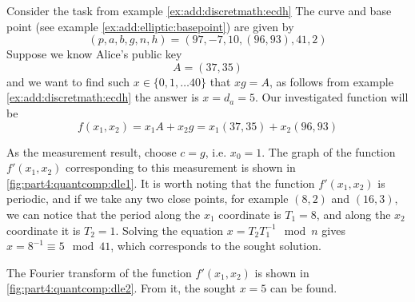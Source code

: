 \begin{example}
Consider the task from example \ref{ex:add:discretmath:ecdh}
The curve and base point (see example \ref{ex:add:elliptic:basepoint})
are given by
\[
(p,a,b,g,n,h) = (97, -7, 10, (96,93), 41, 2)
\]
Suppose we know Alice's public key
\[
A = (37, 35)
\]
and we want to find such $x \in \{0,1, \dots 40\}$ that
$x g = A$, as follows from example \ref{ex:add:discretmath:ecdh}
the answer is $x = d_a  = 5$.
Our investigated function will be
\[
f\left(x_1,x_2\right) = x_1 A + x_2 g = x_1 (37,35) + x_2 (96,93)
\]



As the measurement result, choose $c = g$, i.e. $x_0 = 1$.
The graph of the function $f'(x_1, x_2)$ corresponding to this measurement
is shown in \autoref{fig:part4:quantcomp:dle1}. It is worth noting that
the function $f'(x_1, x_2)$ is periodic, and if we take any two close
points, for example $(8,2)$ and $(16,3)$, we can notice that
the period along the $x_1$ coordinate is $T_1=8$, and along the $x_2$ coordinate it is $T_2
= 1$. Solving the equation $x = T_2 T_1^{-1} \mod n$ gives $x = 8^{-1}
 \equiv 5 \mod 41$, which corresponds to the sought solution.



The Fourier transform of the function $f'(x_1, x_2)$ is shown in
\autoref{fig:part4:quantcomp:dle2}. From it, the sought $x =
5$ can be found. 

\end{example}